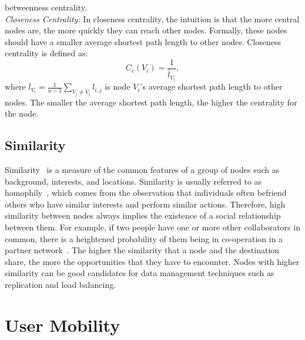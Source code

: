 betweenness centrality.\\
\emph{Closeness Centrality:} In closeness centrality, the intuition is that the more central nodes are, the more quickly they can reach other nodes. Formally, these nodes should have a smaller average shortest path length to other nodes. Closeness centrality is defined as:
\begin{equation}
C_c(V_i)=\frac{1}{\bar{l}_{V_i}},
\end{equation}
where $\bar{l}_{V_i} = \frac{1}{n-1}\sum_{V_j \neq V_i} l_{i,j}$ is node $V_i$'s average shortest path length to other nodes. The smaller the average shortest path length, the higher the centrality for the node.\\

\subsection{Similarity}\label{Chap2_01_04}
Similarity~\cite{EDaly2007} is a measure of the common features of a group of nodes such as background, interests, and locations. Similarity is usually referred to as homophily~\cite{MMcpherson2001}, which comes from the observation that individuals often befriend others who have similar interests and perform similar actions. Therefore, high similarity between nodes always implies the existence of a social relationship between them. For example, if two people have one or more other collaborators in common, there is a heightened probability of them being in co-operation in a partner network~\cite{DLiben-Nowell2007}. The higher the similarity that a node and the destination share, the more the opportunities that they have to encounter. Nodes with higher similarity can be good candidates for data management techniques such as replication and load balancing.

\section{User Mobility}\label{Chap2_02}

